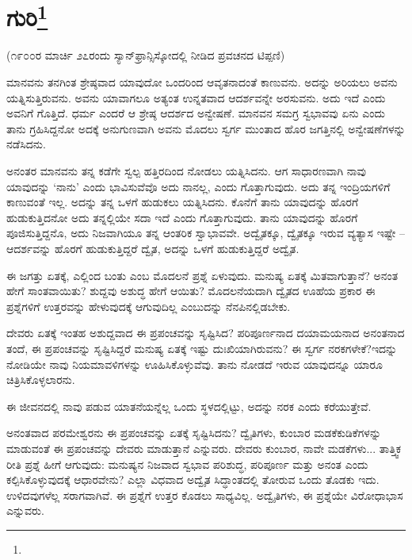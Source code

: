 
\chapter[ಗುರಿ]{ಗುರಿ\protect\footnote{}}

\begin{center}
(೧೯೦೦ರ ಮಾರ್ಚಿ ೨೭ರಂದು ಸ್ಯಾನ್‌ಫ್ರಾನ್ಸಿಸ್ಕೋದಲ್ಲಿ ನೀಡಿದ ಪ್ರವಚನದ ಟಿಪ್ಪಣಿ)
\end{center}

ಮಾನವನು ತನಗಿಂತ ಶ್ರೇಷ್ಠವಾದ ಯಾವುದೋ ಒಂದರಿಂದ ಆವೃತನಾದಂತೆ ಕಾಣುವನು. ಅದನ್ನು ಅರಿಯಲು ಅವನು ಯತ್ನಿಸುತ್ತಿರುವನು. ಅವನು ಯಾವಾಗಲೂ ಅತ್ಯಂತ ಉನ್ನತವಾದ ಆದರ್ಶವನ್ನೇ ಅರಸುವನು. ಅದು ಇದೆ ಎಂದು ಅವನಿಗೆ ಗೊತ್ತಿದೆ. ಧರ್ಮ ಎಂದರೆ ಆ ಶ್ರೇಷ್ಠ ಆದರ್ಶದ ಅನ್ವೇಷಣೆ. ಮಾನವನ ಸಮಗ್ರ ಸ್ವಭಾವವು ಏನು ಎಂದು ತಾನು ಗ್ರಹಿಸಿದ್ದನೋ ಅದಕ್ಕೆ ಅನುಗುಣವಾಗಿ ಅವನು ಮೊದಲು ಸ್ವರ್ಗ ಮುಂತಾದ ಹೊರ ಜಗತ್ತಿನಲ್ಲಿ ಅನ್ವೇಷಣೆಗಳನ್ನು ನಡೆಸಿದನು.

ಅನಂತರ ಮಾನವನು ತನ್ನ ಕಡೆಗೇ ಸ್ವಲ್ಪ ಹತ್ತಿರದಿಂದ ನೋಡಲು ಯತ್ನಿಸಿದನು. ಆಗ ಸಾಧಾರಣವಾಗಿ ನಾವು ಯಾವುದನ್ನು `ನಾನು' ಎಂದು ಭಾವಿಸುವೆವೊ ಅದು ನಾನಲ್ಲ, ಎಂದು ಗೊತ್ತಾಗುವುದು. ಅದು ತನ್ನ ಇಂದ್ರಿಯಗಳಿಗೆ ಕಾಣುವಂತೆ ಇಲ್ಲ. ಅದನ್ನು ತನ್ನ ಒಳಗೆ ಹುಡುಕಲು ಯತ್ನಿಸಿದನು. ಕೊನೆಗೆ ತಾನು ಯಾವುದನ್ನು ಹೊರಗೆ ಹುಡುಕುತ್ತಿದನೋ ಅದು ತನ್ನಲ್ಲಿಯೇ ಸದಾ ಇದೆ ಎಂದು ಗೊತ್ತಾಗುವುದು. ತಾನು ಯಾವುದನ್ನು ಹೊರಗೆ ಪೂಜಿಸುತ್ತಿದ್ದನೊ, ಅದು ನಿಜವಾಗಿಯೂ ತನ್ನ ಆಂತರಿಕ ಸ್ವಾಭಾವವೇ. ಅದ್ವೈತಕ್ಕೂ, ದ್ವೈತಕ್ಕೂ ಇರುವ ವ್ಯತ್ಯಾಸ ಇಷ್ಟೇ – ಆದರ್ಶವನ್ನು ಹೊರಗೆ ಹುಡುಕುತ್ತಿದ್ದರೆ ದ್ವೈತ, ಅದನ್ನು ಒಳಗೆ ಹುಡುಕುತ್ತಿದ್ದರೆ ಅದ್ವೈತ.

ಈ ಜಗತ್ತು ಏತಕ್ಕೆ, ಎಲ್ಲಿಂದ ಬಂತು ಎಂಬ ಮೊದಲನೆ ಪ್ರಶ್ನೆ ಏಳುವುದು. ಮನುಷ್ಯ ಏತಕ್ಕೆ ಮಿತವಾಗುತ್ತಾನೆ? ಅನಂತ ಹೇಗೆ ಸಾಂತವಾಯಿತು? ಶುದ್ದವು ಅಶುದ್ಧ ಹೇಗೆ ಆಯಿತು? ಮೊದಲನೆಯದಾಗಿ ದ್ವೈತದ ಊಹೆಯ ಪ್ರಕಾರ ಈ ಪ್ರಶ್ನೆಗಳಿಗೆ ಉತ್ತರವನ್ನು ಹೇಳುವುದಕ್ಕೆ ಆಗುವುದಿಲ್ಲ ಎಂಬುದನ್ನು ನೆನಪಿನಲ್ಲಿಡಬೇಕು.

ದೇವರು ಏತಕ್ಕೆ ಇಂತಹ ಅಶುದ್ದವಾದ ಈ ಪ್ರಪಂಚವನ್ನು ಸೃಷ್ಟಿಸಿದ? ಪರಿಪೂರ್ಣನಾದ ದಯಾಮಯನಾದ ಅನಂತನಾದ ತಂದೆ, ಈ ಪ್ರಪಂಚವನ್ನು ಸೃಷ್ಟಿಸಿದ್ದರೆ ಮನುಷ್ಯ ಏತಕ್ಕೆ ಇಷ್ಟು ದುಃಖಿಯಾಗಿರುವನು? ಈ ಸ್ವರ್ಗ ನರಕಗಳೇಕೆ?ಇದನ್ನು ನೋಡಿಯೇ ನಾವು ನಿಯಮಾವಳಿಗಳನ್ನು ಊಹಿಸಿಕೊಳ್ಳುವೆವು. ತಾನು ನೋಡದೆ ಇರುವ ಯಾವುದನ್ನೂ ಯಾರೂ ಚಿತ್ರಿಸಿಕೊಳ್ಳಲಾರನು.

ಈ ಜೀವನದಲ್ಲಿ ನಾವು ಪಡುವ ಯಾತನೆಯನ್ನೆಲ್ಲ ಒಂದು ಸ್ಥಳದಲ್ಲಿಟ್ಟು, ಅದನ್ನು ನರಕ ಎಂದು ಕರೆಯುತ್ತೇವೆ.

ಅನಂತವಾದ ಪರಮೇಶ್ವರನು ಈ ಪ್ರಪಂಚವನ್ನು ಏತಕ್ಕೆ ಸೃಷ್ಟಿಸಿದನು? ದ್ವೈತಿಗಳು, ಕುಂಬಾರ ಮಡಕೆಕುಡಿಕೆಗಳನ್ನು ಮಾಡುವಂತೆ ಈ ಪ್ರಪಂಚವನ್ನು ದೇವರು ಮಾಡುತ್ತಾನೆ ಎನ್ನುವರು. ದೇವರು ಕುಂಬಾರ, ನಾವೇ ಮಡಕೆಗಳು... ತಾತ್ತ್ವಿಕ ರೀತಿ ಪ್ರಶ್ನೆ ಹೀಗೆ ಆಗುವುದು: ಮನುಷ್ಯನ ನಿಜವಾದ ಸ್ವಭಾವ ಪರಿಶುದ್ಧ, ಪರಿಪೂರ್ಣ ಮತ್ತು ಅನಂತ ಎಂದು ಕಲ್ಪಿಸಿಕೊಳ್ಳುವುದಕ್ಕೆ ಆಧಾರವೇನು? ಎಲ್ಲಾ ವಿಧವಾದ ಅದ್ವೈತ ಸಿದ್ಧಾಂತದಲ್ಲಿ ತೋರುವ ಒಂದು ತೊಡಕು ಇದು. ಉಳಿದವುಗಳೆಲ್ಲ ಸರಾಗವಾಗಿವೆ. ಈ ಪ್ರಶ್ನೆಗೆ ಉತ್ತರ ಕೊಡಲು ಸಾಧ್ಯವಿಲ್ಲ. ಅದ್ವೈತಿಗಳು, ಈ ಪ್ರಶ್ನೆಯೇ ವಿರೋಧಾಭಾಸ ಎನ್ನುವರು.

